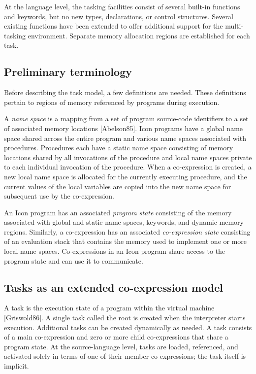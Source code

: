 At the language level, the tasking facilities consist of several
built-in functions and keywords, but no new types, declarations, or
control structures. Several existing functions have been extended to
offer additional support for the multi-tasking environment. 
Separate memory allocation regions are established for each task. 

\subsection{Preliminary terminology}

Before describing the task model, a few definitions are needed. These
definitions pertain to regions of memory referenced by programs during
execution. 

A \textit{name space} is a mapping from a set of program source-code
identifiers to a set of associated memory locations [Abelson85]. Icon
programs have a global name space shared across the entire program and
various name spaces associated with procedures. Procedures each have a
static name space consisting of memory locations shared by all
invocations of the procedure and local name spaces private to each
individual invocation of the procedure.
When a co-expression is created, a new local name space is allocated for
the currently executing procedure, and the current values of the local
variables are copied into the new name space for subsequent use by the
co-expression. 

An Icon program has an associated \textit{program state} consisting of
the memory associated with global and static name spaces, keywords, and
dynamic memory regions. Similarly, a co-expression has an associated
\textit{co-expression state} consisting of an evaluation stack that
contains the memory used to implement one or more local name spaces.
Co-expressions in an Icon program share access to the program state and
can use it to communicate. 

\subsection{Tasks as an extended co-expression model}

A task is the execution state of a program within the virtual machine
[Griswold86]. A single task called the root is created when the
interpreter starts execution. Additional tasks can be created
dynamically as needed.
A task consists of a main co-expression and zero or more child
co-expressions that share a program state. At the source-language
level, tasks are loaded, referenced, and activated solely in terms of
one of their member co-expressions; the task itself is
implicit.


